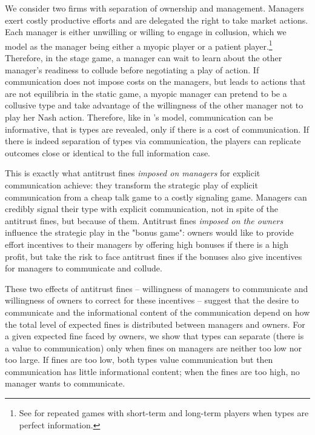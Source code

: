 \documentclass[]{article}
\begin{document}
We consider two firms with separation of ownership and management. Managers exert costly productive efforts and are delegated the right to take market actions. Each manager is either unwilling or willing to engage in collusion, which we model as the manager being either a myopic player or a patient player.\footnote{%
See \cite{fudenberg1990} for repeated games with short-term and long-term players when types are perfect information.} Therefore, in the stage game, a manager can wait to learn about the other manager's readiness to collude before negotiating a play of action. If communication does not impose costs on the managers, but leads to actions that are not equilibria in the static game, a myopic manager can pretend to be a collusive type and take advantage of the willingness of the other manager not to play her Nash action. Therefore, like in \cite{Spence1973}'s model, communication can be informative, that is types are revealed, only if there is a cost of communication. If there is indeed separation of types via communication, the players can replicate outcomes close or identical to the full information case.

This is exactly what antitrust fines \textit{imposed on managers} for explicit communication achieve: they transform the strategic play of explicit communication from a cheap talk game to a costly signaling game. Managers can credibly signal their type with explicit communication, not in spite of the antitrust fines, but because of them. Antitrust fines \textit{imposed on the owners} influence the strategic play in the "bonus game": owners would like to provide effort incentives to their managers by offering high bonuses if there is a high profit, but take the risk to face antitrust fines if the bonuses also give incentives for managers to  communicate and collude.

These two effects of antitrust fines -- willingness of managers to communicate and willingness of owners to correct for these incentives -- suggest that the desire to communicate and the informational content of the communication depend on how the total level of expected fines is distributed between managers and owners. For a given expected fine faced by owners, we show that types can separate (there is a value to communication) only when fines on managers are neither too low nor too large. If fines are too low, both types value communication but then communication has little informational content; when the fines are too high, no manager wants to communicate.  
\end{document}
